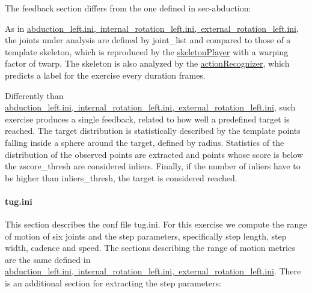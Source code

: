 The feedback section differs from the one defined in sec-\/abduction\+:


\begin{DoxyCode}{0}
\DoxyCodeLine{[feedback]}
\end{DoxyCode}


As in \mbox{\hyperlink{group__motionAnalyzer_sec-abduction}{abduction\+\_\+left.\+ini, internal\+\_\+rotation\+\_\+left.\+ini, external\+\_\+rotation\+\_\+left.\+ini}}, the joints under analysis are defined by {\ttfamily joint\+\_\+list} and compared to those of a template skeleton, which is reproduced by the \mbox{\hyperlink{group__skeletonPlayer}{skeleton\+Player}} with a warping factor of {\ttfamily twarp}. The skeleton is also analyzed by the \mbox{\hyperlink{group__actionRecognizer}{action\+Recognizer}}, which predicts a label for the exercise every {\ttfamily duration} frames.

Differently than \mbox{\hyperlink{group__motionAnalyzer_sec-abduction}{abduction\+\_\+left.\+ini, internal\+\_\+rotation\+\_\+left.\+ini, external\+\_\+rotation\+\_\+left.\+ini}}, such exercise produces a single feedback, related to how well a predefined target is reached. The target distribution is statistically described by the template points falling inside a sphere around the {\ttfamily target}, defined by {\ttfamily radius}. Statistics of the distribution of the observed points are extracted and points whose score is below the {\ttfamily zscore\+\_\+thresh} are considered inliers. Finally, if the number of inliers have to be higher than {\ttfamily inliers\+\_\+thresh}, the target is considered reached.\hypertarget{group__motionAnalyzer_sec-tug}{}\paragraph{tug.\+ini}\label{group__motionAnalyzer_sec-tug}
This section describes the conf file tug.\+ini. For this exercise we compute the range of motion of six joints and the step parameters, specifically step length, step width, cadence and speed. The sections describing the range of motion metrics are the same defined in \mbox{\hyperlink{group__motionAnalyzer_sec-abduction}{abduction\+\_\+left.\+ini, internal\+\_\+rotation\+\_\+left.\+ini, external\+\_\+rotation\+\_\+left.\+ini}}. There is an additional section for extracting the step parameters\+:



